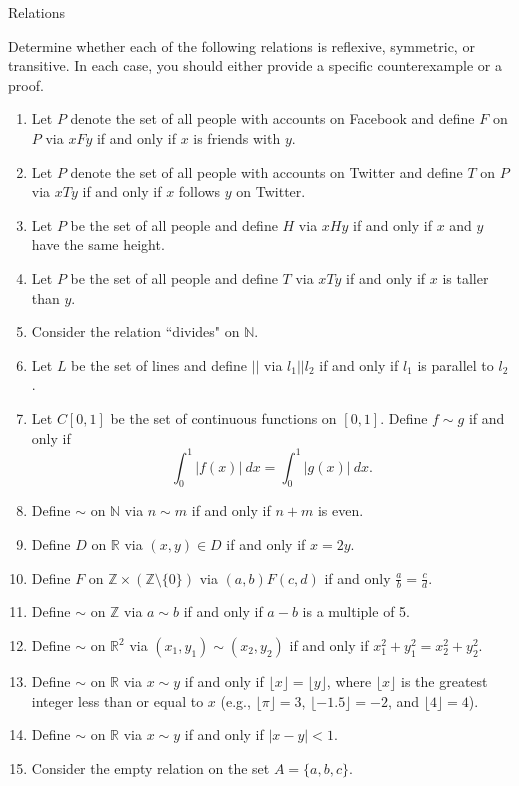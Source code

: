 \begin{section}{Relations}
\begin{problem}\label{prob:lots of relations}
Determine whether each of the following relations is reflexive, symmetric, or transitive. In each case, you should either provide a specific counterexample or a proof.
\begin{enumerate}[label=\textrm{(\alph*)}]
\item\label{prob:facebook} Let $P$ denote the set of all people with accounts on Facebook and define $F$ on $P$ via $xFy$ if and only if $x$ is friends with $y$. 
\item\label{prob:twitter} Let $P$ denote the set of all people with accounts on Twitter and define $T$ on $P$ via $xTy$ if and only if $x$ follows $y$ on Twitter. 
\item Let $P$ be the set of all people and define $H$ via $xHy$ if and only if $x$ and $y$ have the same height.
\item Let $P$ be the set of all people and define $T$ via $xTy$ if and only if $x$ is taller than $y$.
\item Consider the relation ``divides" on $\mathbb{N}$.
\item Let $L$ be the set of lines and define $||$ via $l_1||l_2$ if and only if $l_1$ is parallel to $l_2$.
\item Let $C[0,1]$ be the set of continuous functions on $[0,1]$.  Define $f\sim g$ if and only if
\[
\int_0^1|f(x)|\ dx=\int_0^1|g(x)|\ dx.
\]
\item Define $\sim$ on $\mathbb{N}$ via $n\sim m$ if and only if $n+m$ is even.
\item Define $D$ on $\mathbb{R}$ via $(x,y)\in D$ if and only if $x=2y$.
\item Define $F$ on $\mathbb{Z}\times \left(\mathbb{Z}\setminus \{0\}\right)$ via $(a,b)F(c,d)$ if and only $\frac{a}{b}=\frac{c}{d}$.
\item\label{prob:mod 5} Define $\sim$ on $\mathbb{Z}$ via $a\sim b$ if and only if $a-b$ is a multiple of 5.
\item Define $\sim$ on $\mathbb{R}^2$ via $(x_1,y_1)\sim (x_2,y_2)$ if and only if $x_1^2+y_1^2=x_2^2+y_2^2$.
\item Define $\sim$ on $\mathbb{R}$ via $x\sim y$ if and only if $\lfloor x\rfloor =\lfloor y\rfloor$, where $\lfloor x\rfloor$ is the greatest integer less than or equal to $x$ (e.g., $\lfloor \pi\rfloor=3$, $\lfloor -1.5\rfloor=-2$, and $\lfloor 4\rfloor=4$).
\item Define $\sim$ on $\mathbb{R}$ via $x \sim y$ if and only if $|x-y|<1$.
\item Consider the empty relation on the set $A=\{a,b,c\}$.
\end{enumerate}
\end{problem}


\end{section}
